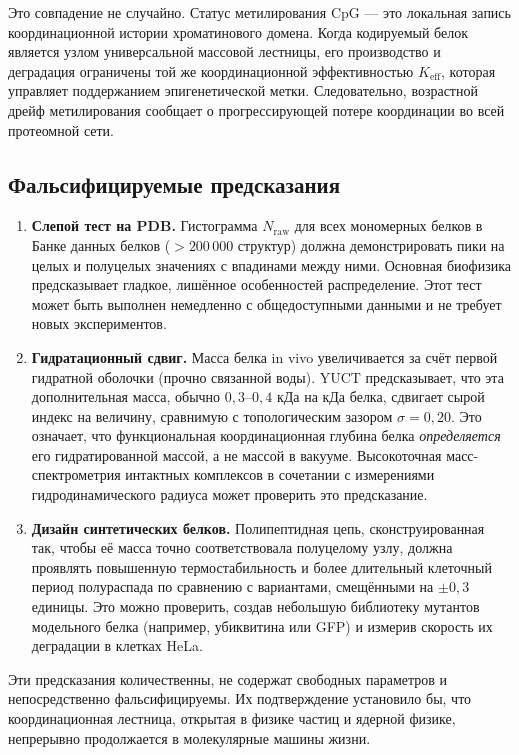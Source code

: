 \documentclass[12pt,a4paper]{article}
\begin{document}
	Это совпадение не случайно. Статус метилирования CpG — это локальная запись координационной истории хроматинового домена. Когда кодируемый белок является узлом универсальной массовой лестницы, его производство и деградация ограничены той же координационной эффективностью \(K_{\mathrm{eff}}\), которая управляет поддержанием эпигенетической метки. Следовательно, возрастной дрейф метилирования сообщает о прогрессирующей потере координации во всей протеомной сети.
	
	\subsection{Фальсифицируемые предсказания}
	\begin{enumerate}
		\item \textbf{Слепой тест на PDB.} Гистограмма \(N_{\mathrm{raw}}\) для всех мономерных белков в Банке данных белков (\(>200\,000\) структур) должна демонстрировать пики на целых и полуцелых значениях с впадинами между ними. Основная биофизика предсказывает гладкое, лишённое особенностей распределение. Этот тест может быть выполнен немедленно с общедоступными данными и не требует новых экспериментов.
		\item \textbf{Гидратационный сдвиг.} Масса белка in vivo увеличивается за счёт первой гидратной оболочки (прочно связанной воды). YUCT предсказывает, что эта дополнительная масса, обычно \(0,3\)--\(0,4\) кДа на кДа белка, сдвигает сырой индекс на величину, сравнимую с топологическим зазором \(\sigma = 0,20\). Это означает, что функциональная координационная глубина белка \emph{определяется} его гидратированной массой, а не массой в вакууме. Высокоточная масс-спектрометрия интактных комплексов в сочетании с измерениями гидродинамического радиуса может проверить это предсказание.
		\item \textbf{Дизайн синтетических белков.} Полипептидная цепь, сконструированная так, чтобы её масса точно соответствовала полуцелому узлу, должна проявлять повышенную термостабильность и более длительный клеточный период полураспада по сравнению с вариантами, смещёнными на \(\pm 0,3\) единицы. Это можно проверить, создав небольшую библиотеку мутантов модельного белка (например, убиквитина или GFP) и измерив скорость их деградации в клетках HeLa.
	\end{enumerate}
	
	Эти предсказания количественны, не содержат свободных параметров и непосредственно фальсифицируемы. Их подтверждение установило бы, что координационная лестница, открытая в физике частиц и ядерной физике, непрерывно продолжается в молекулярные машины жизни.
	
\end{document}
